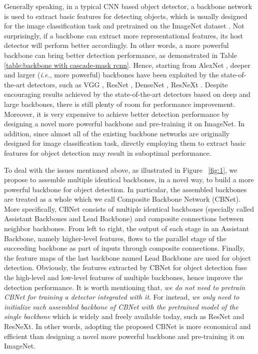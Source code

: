 \documentclass[letterpaper]{article} \usepackage{aaai20}  \usepackage{multirow}
\begin{document}
Generally speaking, in a typical CNN based object detector, a backbone network is used to extract basic features for detecting objects, which is usually designed for the image classification task and pretrained on the ImageNet dataset \cite{deng2009imagenet}. Not surprisingly, if a backbone can extract more representational features, its host detector will perform better accordingly. In other words, a more powerful backbone can bring better detection performance, as demonstrated in Table \ref{table:backbone with cascade-mask rcnn}. Hence, starting from AlexNet \cite{krizhevsky2012imagenet}, deeper and larger (\textit{i.e.}, more powerful) backbones have been exploited by the state-of-the-art detectors, such as VGG \cite{simonyan2014very}, ResNet \cite{he2016deep}, DenseNet    \cite{huang2017densely}, ResNeXt \cite{xie2017aggregated}. Despite encouraging results achieved by the state-of-the-art detectors based on deep and large backbones, there is still plenty of room for performance improvement. Moreover, it is very expensive to achieve better detection performance by designing a novel more powerful backbone and pre-training it on ImageNet. In addition, since almost all of the existing backbone networks are originally designed for image classification task, directly employing them to extract basic features for object detection may result in suboptimal performance.

To deal with the issues mentioned above, as illustrated in Figure ~\ref{fig:1}, we propose to assemble multiple identical backbones, in a novel way, to build a more powerful backbone for object detection. In particular, the assembled backbones are treated as a whole which we call Composite Backbone Network (CBNet). More specifically, CBNet consists of multiple identical backbones (specially called Assistant Backbones and Lead Backbone) and composite connections between neighbor backbones. From left to right, the output of each stage in an Assistant Backbone, namely higher-level features, flows to the parallel stage of the succeeding backbone as part of inputs through composite connections. Finally, the feature maps of the last backbone named Lead Backbone are used for object detection.  Obviously, the features extracted by CBNet for object detection fuse the high-level and low-level features of multiple backbones, hence improve the detection performance. It is worth mentioning that, \textit{we do not need to pretrain CBNet for training a detector integrated with it}. For instead, \textit{we only need to initialize each assembled backbone of CBNet with the pretrained model of the single backbone} which is widely and freely available today, such as ResNet and ResNeXt. In other words, adopting the proposed CBNet is more economical and efficient than designing a novel more powerful backbone and pre-training it on ImageNet.
\end{document}

